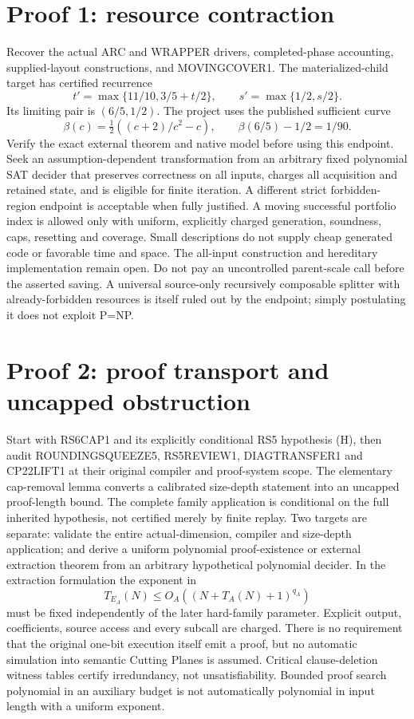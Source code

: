\documentclass[11pt]{article}
\begin{document}
\section{Proof 1: resource contraction}
Recover the actual ARC and WRAPPER drivers, completed-phase accounting, supplied-layout constructions, and MOVINGCOVER1. The materialized-child target has certified recurrence
\[
 t'=\max\{11/10,3/5+t/2\},\qquad s'=\max\{1/2,s/2\}.
\]
Its limiting pair is $(6/5,1/2)$. The project uses the published sufficient curve
\[
 \beta(c)=\tfrac12((c+2)/c^2-c),\qquad \beta(6/5)-1/2=1/90.
\]
Verify the exact external theorem and native model before using this endpoint. Seek an assumption-dependent transformation from an arbitrary fixed polynomial SAT decider that preserves correctness on all inputs, charges all acquisition and retained state, and is eligible for finite iteration. A different strict forbidden-region endpoint is acceptable when fully justified. A moving successful portfolio index is allowed only with uniform, explicitly charged generation, soundness, caps, resetting and coverage. Small descriptions do not supply cheap generated code or favorable time and space.
The all-input construction and hereditary implementation remain open. Do not pay an uncontrolled parent-scale call before the asserted saving. A universal source-only recursively composable splitter with already-forbidden resources is itself ruled out by the endpoint; simply postulating it does not exploit P=NP.

\section{Proof 2: proof transport and uncapped obstruction}
Start with RS6CAP1 and its explicitly conditional RS5 hypothesis (H), then audit ROUNDINGSQUEEZE5, RS5REVIEW1, DIAGTRANSFER1 and CP22LIFT1 at their original compiler and proof-system scope. The elementary cap-removal lemma converts a calibrated size-depth statement into an uncapped proof-length bound. The complete family application is conditional on the full inherited hypothesis, not certified merely by finite replay.
Two targets are separate: validate the entire actual-dimension, compiler and size-depth application; and derive a uniform polynomial proof-existence or external extraction theorem from an arbitrary hypothetical polynomial decider. In the extraction formulation the exponent in
\[
 T_{E_A}(N)\le O_A((N+T_A(N)+1)^{q_A})
\]
must be fixed independently of the later hard-family parameter. Explicit output, coefficients, source access and every subcall are charged. There is no requirement that the original one-bit execution itself emit a proof, but no automatic simulation into semantic Cutting Planes is assumed. Critical clause-deletion witness tables certify irredundancy, not unsatisfiability. Bounded proof search polynomial in an auxiliary budget is not automatically polynomial in input length with a uniform exponent.
\end{document}
